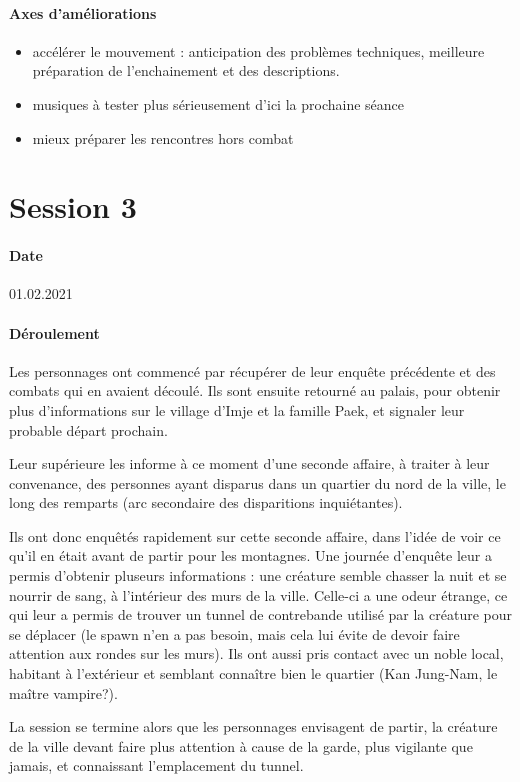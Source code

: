 \documentclass[10pt,a4paper]{book}
\begin{document}
\paragraph{Axes d'améliorations}
\begin{itemize}
\item accélérer le mouvement : anticipation des problèmes techniques, meilleure préparation de l'enchainement et des descriptions.
\item musiques à tester plus sérieusement d'ici la prochaine séance
\item mieux préparer les rencontres hors combat
\end{itemize}

\section{Session 3}
\paragraph{Date}01.02.2021
\paragraph{Déroulement}
Les personnages ont commencé par récupérer de leur enquête précédente et des combats qui en avaient découlé. Ils sont ensuite retourné au palais, pour obtenir plus d'informations sur le village d'Imje et la famille Paek, et signaler leur probable départ prochain.

Leur supérieure les informe à ce moment d'une seconde affaire, à traiter à leur convenance, des personnes ayant disparus dans un quartier du nord de la ville, le long des remparts (arc secondaire des disparitions inquiétantes).

Ils ont donc enquêtés rapidement sur cette seconde affaire, dans l'idée de voir ce qu'il en était avant de partir pour les montagnes. Une journée d'enquête leur a permis d'obtenir pluseurs informations : une créature semble chasser la nuit et se nourrir de sang, à l'intérieur des murs de la ville. Celle-ci a une odeur étrange, ce qui leur a permis de trouver un tunnel de contrebande utilisé par la créature pour se déplacer (le spawn n'en a pas besoin, mais cela lui évite de devoir faire attention aux rondes sur les murs). Ils ont aussi pris contact avec un noble local, habitant à l'extérieur et semblant connaître bien le quartier (Kan Jung-Nam, le maître vampire?).

La session se termine alors que les personnages envisagent de partir, la créature de la ville devant faire plus attention à cause de la garde, plus vigilante que jamais, et connaissant l'emplacement du tunnel.
\end{document}
